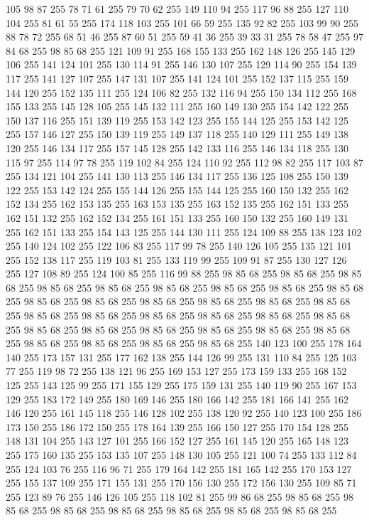 105 98 87 255 78 71 61 255 79 70 62 255 149 110 94 255 117 96 88 255 127 110 104 255 81 61 55 255 174 118 103 255 101 66 59 255 135 92 82 255 103 99 90 255 88 78 72 255 68 51 46 255 87 60 51 255 59 41 36 255 39 33 31 255 78 58 47 255 97 84 68 255 98 85 68 255 121 109 91 255 168 155 133 255 162 148 126 255 145 129 106 255 141 124 101 255 130 114 91 255 146 130 107 255 129 114 90 255 154 139 117 255 141 127 107 255 147 131 107 255 141 124 101 255 152 137 115 255 159 144 120 255 152 135 111 255 124 106 82 255 132 116 94 255 150 134 112 255 168 155 133 255 145 128 105 255 145 132 111 255 160 149 130 255 154 142 122 255 150 137 116 255 151 139 119 255 153 142 123 255 155 144 125 255 153 142 125 255 157 146 127 255 150 139 119 255 149 137 118 255 140 129 111 255 149 138 120 255 146 134 117 255 157 145 128 255 142 133 116 255 146 134 118 255 130 115 97 255 114 97 78 255 119 102 84 255 124 110 92 255 112 98 82 255 117 103 87 255 134 121 104 255 141 130 113 255
146 134 117 255 136 125 108 255 150 139 122 255 153 142 124 255 155 144 126 255 155 144 125 255 160 150 132 255 162 152 134 255 162 153 135 255 163 153 135 255 163 152 135 255 162 151 133 255 162 151 132 255 162 152 134 255 161 151 133 255 160 150 132 255 160 149 131 255 162 151 133 255 154 143 125 255 144 130 111 255 124 109 88 255 138 123 102 255 140 124 102 255 122 106 83 255 117 99 78 255 140 126 105 255 135 121 101 255 152 138 117 255 119 103 81 255 133 119 99 255 109 91 87 255 130 127 126 255 127 108 89 255 124 100 85 255 116 99 88 255 98 85 68 255 98 85 68 255 98 85 68 255 98 85 68 255 98 85 68 255 98 85 68 255 98 85 68 255 98 85 68 255 98 85 68 255 98 85 68 255 98 85 68 255 98 85 68 255 98 85 68 255 98 85 68 255 98 85 68 255 98 85 68 255 98 85 68 255 98 85 68 255 98 85 68 255 98 85 68 255 98 85 68 255 98 85 68 255 98 85 68 255 98 85 68 255 98 85 68 255 98 85 68 255 98 85 68 255 98 85 68 255 98 85 68 255
98 85 68 255 98 85 68 255 140 123 100 255 178 164 140 255 173 157 131 255 177 162 138 255 144 126 99 255 131 110 84 255 125 103 77 255 119 98 72 255 138 121 96 255 169 153 127 255 173 159 133 255 168 152 125 255 143 125 99 255 171 155 129 255 175 159 131 255 140 119 90 255 167 153 129 255 183 172 149 255 180 169 146 255 180 166 142 255 181 166 141 255 162 146 120 255 161 145 118 255 146 128 102 255 138 120 92 255 140 123 100 255 186 173 150 255 186 172 150 255 178 164 139 255 166 150 127 255 170 154 128 255 148 131 104 255 143 127 101 255 166 152 127 255 161 145 120 255 165 148 123 255 175 160 135 255 153 135 107 255 148 130 105 255 121 100 74 255 133 112 84 255 124 103 76 255 116 96 71 255 179 164 142 255 181 165 142 255 170 153 127 255 155 137 109 255 171 155 131 255 170 156 130 255 172 156 130 255 109 85 71 255 123 89 76 255 146 126 105 255 118 102 81 255 99 86 68 255 98 85 68 255 98 85 68 255 98 85 68 255 98 85 68 255 98 85 68 255 98 85 68 255 98 85 68 255
